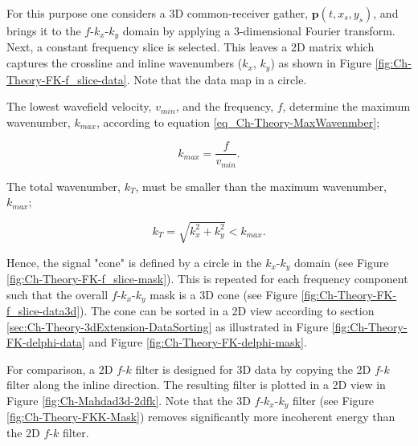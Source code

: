 For this purpose one considers a 3D common-receiver gather, $\mathbf{p}(t,x_s,y_s)$, and brings it to the $f$-$k_x$-$k_y$ domain by applying a 3-dimensional Fourier transform. Next, a constant frequency slice is selected. This leaves a 2D matrix which captures the crossline and inline wavenumbers ($k_x$, $k_y$) as shown in Figure \ref{fig:Ch-Theory-FK-f_slice-data}. Note that the data map in a circle.


The lowest wavefield velocity, $v_{min}$, and the frequency, $f$, determine the maximum wavenumber, $k_{max}$, according to equation \ref{eq_Ch-Theory-MaxWavenmber};

\begin{equation}
	k_{max} = \frac{f}{v_{min}}.
	\label{eq_Ch-Theory-MaxWavenmber-Repetition}
\end{equation} 

The total wavenumber, $k_{T}$, must be smaller than the maximum wavenumber, $k_{max}$;

\begin{equation}
	k_{T} = \sqrt{k_x^2 + k_{y}^2} < k_{max}.
	\label{eq:Ch-Theory-TotalWavenumber}
\end{equation}

Hence, the signal "cone" is defined by a circle in the $k_x$-$k_y$ domain (see Figure \ref{fig:Ch-Theory-FK-f_slice-mask}). This is repeated for each frequency component such that the overall $f$-$k_x$-$k_y$ mask is a 3D cone (see Figure \ref{fig:Ch-Theory-FK-f_slice-data3d}). The cone can be sorted in a 2D view according to section \ref{sec:Ch-Theory-3dExtension-DataSorting} as illustrated in Figure \ref{fig:Ch-Theory-FK-delphi-data} and Figure \ref{fig:Ch-Theory-FK-delphi-mask}. 

For comparison, a 2D $f$-$k$ filter is designed for 3D data by copying the 2D $f$-$k$ filter along the inline direction. The resulting filter is  plotted in a 2D view in Figure \ref{fig:Ch-Mahdad3d-2dfk}. Note that the 3D $f$-$k_x$-$k_y$ filter (see Figure \ref{fig:Ch-Theory-FKK-Mask}) removes significantly more incoherent energy than the 2D $f$-$k$ filter. 



